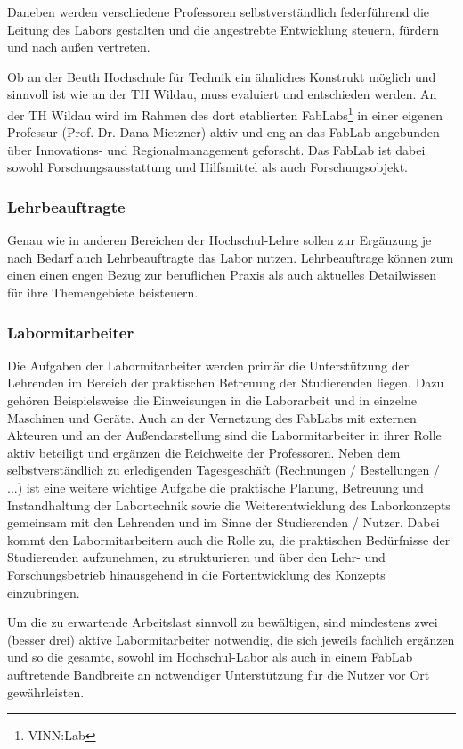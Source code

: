 \documentclass[parskip=half,headsepline,footsepline,titlepage]{scrartcl}
\begin{document}
Daneben werden verschiedene Professoren selbstverständlich federführend die Leitung des Labors gestalten und die angestrebte Entwicklung steuern, fürdern und nach außen vertreten.

Ob an der Beuth Hochschule für Technik ein ähnliches Konstrukt möglich und sinnvoll ist wie an der TH Wildau, muss evaluiert und entschieden werden. An der TH Wildau wird im Rahmen des dort etablierten FabLabs\footnote{VINN:Lab} in einer eigenen Professur (Prof. Dr. Dana Mietzner) aktiv und eng an das FabLab angebunden über Innovations- und Regionalmanagement geforscht. Das FabLab ist dabei sowohl Forschungsausstattung und Hilfsmittel als auch Forschungsobjekt.

\subsubsection{Lehrbeauftragte}
Genau wie in anderen Bereichen der Hochschul-Lehre sollen zur Ergänzung je nach Bedarf auch Lehrbeauftragte das Labor nutzen. Lehrbeauftrage können zum einen einen engen Bezug zur beruflichen Praxis als auch aktuelles Detailwissen für ihre Themengebiete beisteuern.

\subsubsection{Labormitarbeiter}
Die Aufgaben der Labormitarbeiter werden primär die Unterstützung der Lehrenden im Bereich der praktischen Betreuung der Studierenden liegen. Dazu gehören Beispielsweise die Einweisungen in die Laborarbeit und in einzelne Maschinen und Geräte.
Auch an der Vernetzung des FabLabs mit externen Akteuren und an der Außendarstellung sind die Labormitarbeiter in ihrer Rolle aktiv beteiligt und ergänzen die Reichweite der Professoren.
Neben dem selbstverständlich zu erledigenden Tagesgeschäft (Rechnungen / Bestellungen / ...) ist eine weitere wichtige Aufgabe die praktische Planung, Betreuung und Instandhaltung der Labortechnik sowie die Weiterentwicklung des Laborkonzepts gemeinsam mit den Lehrenden und im Sinne der Studierenden / Nutzer. Dabei kommt den Labormitarbeitern auch die Rolle zu, die praktischen Bedürfnisse der Studierenden aufzunehmen, zu strukturieren und über den Lehr- und Forschungsbetrieb hinausgehend in die Fortentwicklung des Konzepts einzubringen.

Um die zu erwartende Arbeitslast sinnvoll zu bewältigen, sind mindestens zwei (besser drei) aktive Labormitarbeiter notwendig, die sich jeweils fachlich ergänzen und so die gesamte, sowohl im Hochschul-Labor als auch in einem FabLab auftretende Bandbreite an notwendiger Unterstützung für die Nutzer vor Ort gewährleisten.
\end{document}
